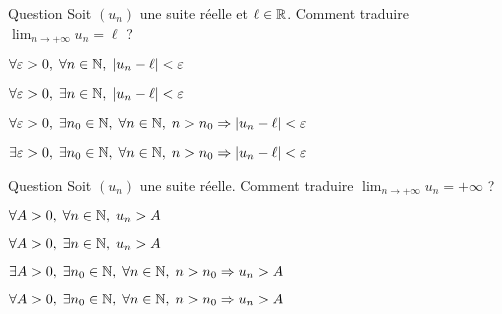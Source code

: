 

\begin{multi}[multiple,feedback=
{C'est la définition de \(\displaystyle \lim _{n\to +\infty}u_n=\ell\) : \(\forall \varepsilon >0,\; \exists n_0\in \Nn,\; \forall n\in \Nn,\; n>n_0\Rightarrow |u_n-\ell|<\varepsilon\).
}]{Question}
Soit \((u_n)\) une suite réelle et \(\ell \in \mathbb{R}\). Comment traduire \(\displaystyle \lim _{n\to +\infty}u_n=\ell\) ?

    \item \(\forall \varepsilon >0,\; \forall n\in \mathbb{N},\; |u_n-\ell|<\varepsilon\)
    \item \(\forall \varepsilon >0,\; \exists n\in \mathbb{N},\; |u_n-\ell|<\varepsilon\)
    \item* \(\forall \varepsilon >0,\; \exists n_0\in \Nn,\; \forall n\in \Nn,\; n>n_0\Rightarrow |u_n-\ell|<\varepsilon\)
    \item \(\exists \varepsilon >0,\; \exists n_0\in \mathbb{N},\; \forall n\in \mathbb{N},\; n>n_0\Rightarrow |u_n-\ell|<\varepsilon\)
\end{multi}


\begin{multi}[multiple,feedback=
{C'est la définition \(\displaystyle \lim _{n\to +\infty}u_n=+\infty\) : \(\forall A>0,\; \exists n_0\in \Nn,\; \forall n\in \Nn,\; n>n_0\Rightarrow u_n>A\).
}]{Question}
Soit \((u_n)\) une suite réelle. Comment traduire \(\displaystyle \lim _{n\to +\infty}u_n=+\infty\) ?

    \item \(\forall A>0,\; \forall n\in \mathbb{N},\; u_n>A\)
    \item \(\forall A>0,\; \exists n\in \mathbb{N},\; u_n>A\)
    \item \(\exists A>0,\; \exists n_0\in \mathbb{N},\; \forall n\in \mathbb{N},\; n>n_0\Rightarrow u_n>A\)
    \item* \(\forall A>0,\; \exists n_0\in \Nn,\; \forall n\in \Nn,\; n>n_0\Rightarrow u_n>A\)
\end{multi}


